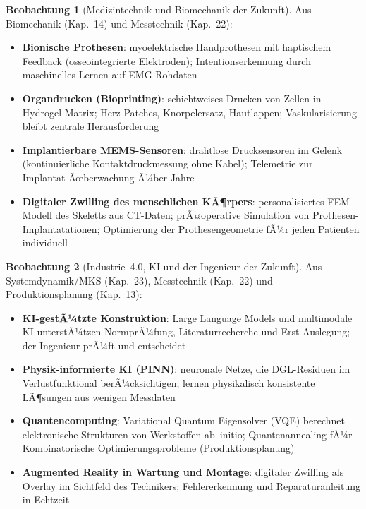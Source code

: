 ﻿\documentclass[a4paper,12pt]{report}
\theoremstyle{definition}
\newtheorem{beobachtung}{Beobachtung}
\begin{document}
\begin{beobachtung}[Medizintechnik und Biomechanik der Zukunft]
Aus Biomechanik (Kap.~14) und Messtechnik (Kap.~22):
\begin{itemize}
    \item[-] \textbf{Bionische Prothesen}: myoelektrische Handprothesen mit
          haptischem Feedback (osseointegrierte Elektroden);
          Intentionserkennung durch maschinelles Lernen auf EMG-Rohdaten
    \item[-] \textbf{Organdrucken (Bioprinting)}: schichtweises Drucken von
          Zellen in Hydrogel-Matrix; Herz-Patches, Knorpelersatz, Hautlappen;
          Vaskularisierung bleibt zentrale Herausforderung
    \item[-] \textbf{Implantierbare MEMS-Sensoren}: drahtlose Drucksensoren
          im Gelenk (kontinuierliche Kontaktdruckmessung ohne Kabel);
          Telemetrie zur Implantat-Ãœberwachung Ã¼ber Jahre
    \item[-] \textbf{Digitaler Zwilling des menschlichen KÃ¶rpers}:
          personalisiertes FEM-Modell des Skeletts aus CT-Daten;
          prÃ¤operative Simulation von Prothesen-Implantatationen;
          Optimierung der Prothesen\-geometrie fÃ¼r jeden Patienten individuell
\end{itemize}
\end{beobachtung}

\begin{beobachtung}[Industrie~4.0, KI und der Ingenieur der Zukunft]
Aus Systemdynamik/MKS (Kap.~23), Messtechnik (Kap.~22) und
Produktionsplanung (Kap.~13):
\begin{itemize}
    \item[-] \textbf{KI-gestÃ¼tzte Konstruktion}: Large Language Models
          und multimodale KI unterstÃ¼tzen NormprÃ¼fung, Literaturrecherche
          und Erst-Auslegung; der Ingenieur prÃ¼ft und entscheidet
    \item[-] \textbf{Physik-informierte KI (PINN)}: neuronale Netze,
          die DGL-Residuen im Verlustfunktional berÃ¼cksichtigen;
          lernen physikalisch konsistente LÃ¶sungen aus wenigen Messdaten
    \item[-] \textbf{Quantencomputing}: Variational Quantum Eigensolver (VQE)
          berechnet elektronische Strukturen von Werkstoffen ab~initio;
          Quantenannealing fÃ¼r Kombinatorische Optimierungsprobleme (Produktionsplanung)
    \item[-] \textbf{Augmented Reality in Wartung und Montage}:
          digitaler Zwilling als Overlay im Sichtfeld des Technikers;
          Fehlererkennung und Reparaturanleitung in Echtzeit
\end{itemize}
\end{beobachtung}
\end{document}
